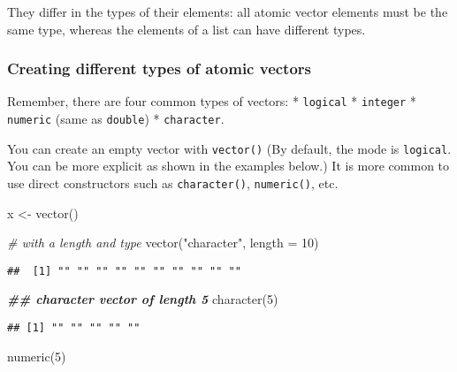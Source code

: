 \documentclass[
]{book}
\newenvironment{Shaded}{\begin{snugshade}}{\end{snugshade}}
\newcommand{\AttributeTok}[1]{\textcolor[rgb]{0.77,0.63,0.00}{#1}}
\newcommand{\CommentTok}[1]{\textcolor[rgb]{0.56,0.35,0.01}{\textit{#1}}}
\newcommand{\DecValTok}[1]{\textcolor[rgb]{0.00,0.00,0.81}{#1}}
\newcommand{\DocumentationTok}[1]{\textcolor[rgb]{0.56,0.35,0.01}{\textbf{\textit{#1}}}}
\newcommand{\FunctionTok}[1]{\textcolor[rgb]{0.00,0.00,0.00}{#1}}
\newcommand{\NormalTok}[1]{#1}
\newcommand{\OtherTok}[1]{\textcolor[rgb]{0.56,0.35,0.01}{#1}}
\newcommand{\StringTok}[1]{\textcolor[rgb]{0.31,0.60,0.02}{#1}}
\begin{document}
They differ in the types of their elements: all atomic vector elements must be the same type, whereas the elements of a list can have different types.

\hypertarget{creating-different-types-of-atomic-vectors}{%
\subsubsection{Creating different types of atomic vectors}\label{creating-different-types-of-atomic-vectors}}

Remember, there are four common types of vectors:
* \texttt{logical}
* \texttt{integer}
* \texttt{numeric} (same as \texttt{double})
* \texttt{character}.

You can create an empty vector with \texttt{vector()} (By default, the mode is \texttt{logical}. You can be more explicit as shown in the examples below.) It is more common to use direct constructors such as \texttt{character()}, \texttt{numeric()}, etc.

\begin{Shaded}
\begin{Highlighting}[]
\NormalTok{x }\OtherTok{\textless{}{-}} \FunctionTok{vector}\NormalTok{()}

\CommentTok{\# with a length and type}
\FunctionTok{vector}\NormalTok{(}\StringTok{"character"}\NormalTok{, }\AttributeTok{length =} \DecValTok{10}\NormalTok{)}
\end{Highlighting}
\end{Shaded}

\begin{verbatim}
##  [1] "" "" "" "" "" "" "" "" "" ""
\end{verbatim}

\begin{Shaded}
\begin{Highlighting}[]
\DocumentationTok{\#\# character vector of length 5}
\FunctionTok{character}\NormalTok{(}\DecValTok{5}\NormalTok{)}
\end{Highlighting}
\end{Shaded}

\begin{verbatim}
## [1] "" "" "" "" ""
\end{verbatim}

\begin{Shaded}
\begin{Highlighting}[]
\FunctionTok{numeric}\NormalTok{(}\DecValTok{5}\NormalTok{)}
\end{Highlighting}
\end{Shaded}
\end{document}
